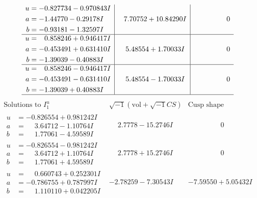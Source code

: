 \documentclass[1p]{elsarticle_modified}
\theoremstyle{definition}
\newcommand{\I}{\sqrt{-1}}
\begin{document}
$$\begin{array}{c|c|c}
\begin{aligned}
u &= -0.827734 - 0.970843 I \\
a &= -1.44770 - 0.29178 I \\
b &= -0.93181 - 1.32597 I\end{aligned}
 & \phantom{-}7.70752 + 10.84290 I & \phantom{-0.000000 } 0 \\ \hline\begin{aligned}
u &= \phantom{-}0.858246 + 0.946417 I \\
a &= -0.453491 + 0.631410 I \\
b &= -1.39039 - 0.40883 I\end{aligned}
 & \phantom{-}5.48554 + 1.70033 I & \phantom{-0.000000 } 0 \\ \hline\begin{aligned}
u &= \phantom{-}0.858246 - 0.946417 I \\
a &= -0.453491 - 0.631410 I \\
b &= -1.39039 + 0.40883 I\end{aligned}
 & \phantom{-}5.48554 - 1.70033 I & \phantom{-0.000000 } 0\\
 \hline 
 \end{array}$$\newpage$$\begin{array}{c|c|c}  
\text{Solutions to }I^u_{1}& \I (\text{vol} + \sqrt{-1}CS) & \text{Cusp shape}\\
 \hline 
\begin{aligned}
u &= -0.826554 + 0.981242 I \\
a &= \phantom{-}3.64712 - 1.10764 I \\
b &= \phantom{-}1.77061 - 4.59589 I\end{aligned}
 & \phantom{-}2.7778 - 15.2746 I & \phantom{-0.000000 } 0 \\ \hline\begin{aligned}
u &= -0.826554 - 0.981242 I \\
a &= \phantom{-}3.64712 + 1.10764 I \\
b &= \phantom{-}1.77061 + 4.59589 I\end{aligned}
 & \phantom{-}2.7778 + 15.2746 I & \phantom{-0.000000 } 0 \\ \hline\begin{aligned}
u &= \phantom{-}0.660743 + 0.252301 I \\
a &= -0.786755 + 0.787997 I \\
b &= \phantom{-}1.110110 + 0.042205 I\end{aligned}
 & -2.78259 - 7.30543 I & -7.59550 + 5.05432 I \\ \hline\begin{aligned}

\end{aligned}
\end{array}$$
\end{document}
